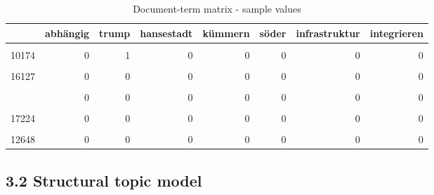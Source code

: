 \documentclass[
  12pt,
]{article}
\begin{document}
\begin{table}[H]

\caption{\label{tab:Document term matrix}Document-term matrix - sample values \label{table:dtm}}
\centering
\fontsize{7}{9}\selectfont
\begin{tabular}[t]{lrrrrrrr}
\toprule
  & abhängig & trump & hansestadt & kümmern & söder & infrastruktur & integrieren\\
\midrule
\cellcolor{gray!6}{15324} & \cellcolor{gray!6}{0} & \cellcolor{gray!6}{0} & \cellcolor{gray!6}{0} & \cellcolor{gray!6}{0} & \cellcolor{gray!6}{0} & \cellcolor{gray!6}{0} & \cellcolor{gray!6}{0}\\
10174 & 0 & 1 & 0 & 0 & 0 & 0 & 0\\
\cellcolor{gray!6}{9953} & \cellcolor{gray!6}{0} & \cellcolor{gray!6}{0} & \cellcolor{gray!6}{0} & \cellcolor{gray!6}{0} & \cellcolor{gray!6}{0} & \cellcolor{gray!6}{0} & \cellcolor{gray!6}{0}\\
16127 & 0 & 0 & 0 & 0 & 0 & 0 & 0\\
\cellcolor{gray!6}{13332} & \cellcolor{gray!6}{0} & \cellcolor{gray!6}{0} & \cellcolor{gray!6}{0} & \cellcolor{gray!6}{0} & \cellcolor{gray!6}{0} & \cellcolor{gray!6}{0} & \cellcolor{gray!6}{0}\\
\addlinespace
957 & 0 & 0 & 0 & 0 & 0 & 0 & 0\\
\cellcolor{gray!6}{10386} & \cellcolor{gray!6}{0} & \cellcolor{gray!6}{0} & \cellcolor{gray!6}{0} & \cellcolor{gray!6}{0} & \cellcolor{gray!6}{0} & \cellcolor{gray!6}{0} & \cellcolor{gray!6}{0}\\
17224 & 0 & 0 & 0 & 0 & 0 & 0 & 0\\
\cellcolor{gray!6}{18642} & \cellcolor{gray!6}{0} & \cellcolor{gray!6}{0} & \cellcolor{gray!6}{0} & \cellcolor{gray!6}{0} & \cellcolor{gray!6}{0} & \cellcolor{gray!6}{0} & \cellcolor{gray!6}{0}\\
12648 & 0 & 0 & 0 & 0 & 0 & 0 & 0\\
\bottomrule
\end{tabular}
\end{table}

\hypertarget{structural-topic-model}{%
\subsection{3.2 Structural topic model}\label{structural-topic-model}}
\end{document}
